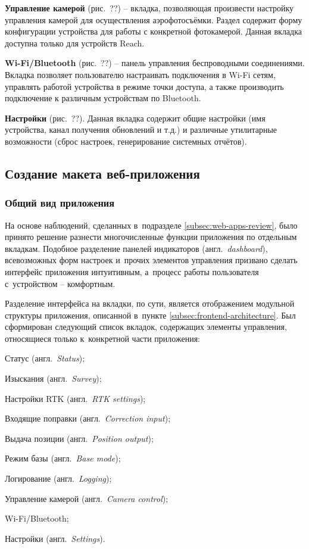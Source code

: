 \textbf{Управление камерой} (рис.~??) -- вкладка, позволяющая произвести настройку управления камерой для осуществления аэрофотосъёмки. Раздел содержит форму конфигурации устройства для работы с конкретной фотокамерой. Данная вкладка доступна только для устройств Reach.

\textbf{Wi-Fi/Bluetooth} (рис.~??) -- панель управления беспроводными соединениями. Вкладка позволяет пользователю настраивать подключения в Wi-Fi сетям, управлять работой устройства в режиме точки доступа, а также производить подключение к различным устройствам по Bluetooth.

\textbf{Настройки} (рис.~??). Данная вкладка содержит общие настройки (имя устройства, канал получения обновлений и т.д.) и различные утилитарные возможности (сброс настроек, генерирование системных отчётов).

\subsection{Создание макета веб-приложения}
\label{subsec:app-sketch}

\subsubsection{Общий вид приложения}
\label{subsec:app-sketch-general}

На основе наблюдений, сделанных в~подразделе \ref{subsec:web-apps-review}, было принято решение разнести многочисленные функции приложения по отдельным вкладкам. Подобное разделение панелей индикаторов (англ.~\emph{dashboard}), всевозможных форм настроек и~прочих элементов управления призвано сделать интерфейс приложения интуитивным, а~процесс работы пользователя с~устройством -- комфортным.

Разделение интерфейса на вкладки, по сути, является отображением модульной структуры приложения, описанной в~пункте \ref{subsec:frontend-architecture}. Был сформирован следующий список вкладок, содержащих элементы управления, относящиеся только к~конкретной части приложения:

\begin{dashitemize}
  \item Статус (англ.~\emph{Status});
  \item Изыскания (англ.~\emph{Survey});
  \item Настройки RTK (англ.~\emph{RTK settings});
  \item Входящие поправки (англ.~\emph{Correction input});
  \item Выдача позиции (англ.~\emph{Position output});
  \item Режим базы (англ.~\emph{Base mode});
  \item Логирование (англ.~\emph{Logging});
  \item Управление камерой (англ.~\emph{Camera control});
  \item Wi-Fi/Bluetooth;
  \item Настройки (англ.~\emph{Settings}).
\end{dashitemize}

